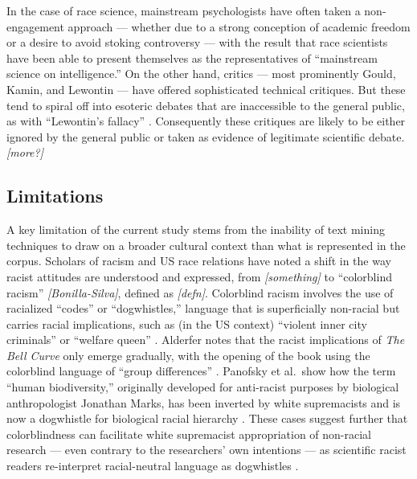 \documentclass[12pt]{article}
\begin{document}
In the case of race science, mainstream psychologists have often taken a non-engagement approach --- whether due to a strong conception of academic freedom or a desire to avoid stoking controversy --- with the result that race scientists have been able to present themselves as the representatives of ``mainstream science on intelligence.'' On the other hand, critics --- most prominently Gould, Kamin, and Lewontin --- have offered sophisticated technical critiques. But these tend to spiral off into esoteric debates that are inaccessible to the general public, as with ``Lewontin's fallacy'' \cite{RosemanLewontinDidNot2021}. Consequently these critiques are likely to be either ignored by the general public or taken as evidence of legitimate scientific debate.\\
\emph{{[}more?{]}}

\hypertarget{limitations}{%
\subsection*{Limitations}\label{limitations}}

A key limitation of the current study stems from the inability of text mining techniques to draw on a broader cultural context than what is represented in the corpus. Scholars of racism and US race relations have noted a shift in the way racist attitudes are understood and expressed, from \emph{{[}something{]}} to ``colorblind racism'' \emph{{[}Bonilla-Silva{]}}, defined as \emph{{[}defn{]}}. Colorblind racism involves the use of racialized ``codes'' or ``dogwhistles,'' language that is superficially non-racial but carries racial implications, such as (in the US context) ``violent inner city criminals'' or ``welfare queen'' \cite{SaulDogwhistlesPoliticalManipulation2018}. Alderfer notes that the racist implications of \emph{The Bell Curve} only emerge gradually, with the opening of the book using the colorblind language of ``group differences'' \cite{AlderferScienceNonsciencePsychologists2003}. Panofsky et al.~show how the term ``human biodiversity,'' originally developed for anti-racist purposes by biological anthropologist Jonathan Marks, has been inverted by white supremacists and is now a dogwhistle for biological racial hierarchy \cite{PanofskyHowWhiteNationalists2021}. These cases suggest further that colorblindness can facilitate white supremacist appropriation of non-racial research --- even contrary to the researchers' own intentions --- as scientific racist readers re-interpret racial-neutral language as dogwhistles \cite{GillbornSoftlySoftlyGenetics2016, WillsAreClustersRaces2017}.
\end{document}
